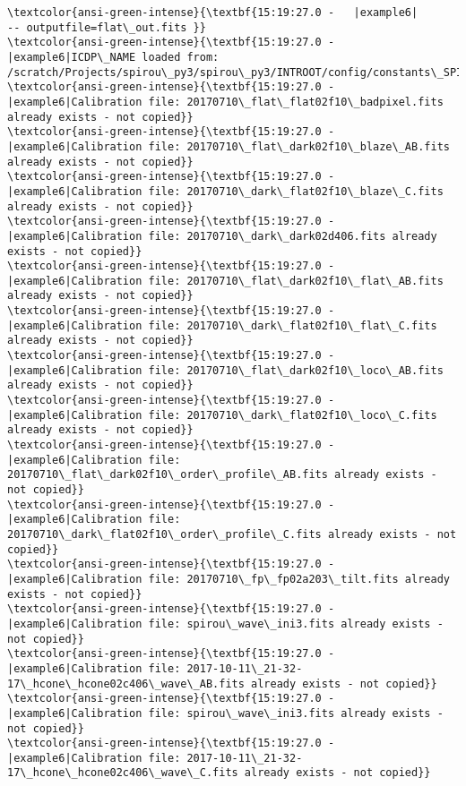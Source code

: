 \documentclass[11pt]{article}
\begin{document}
\begin{Verbatim}[commandchars=\\\{\}]
\textcolor{ansi-green-intense}{\textbf{15:19:27.0 -   |example6|       -- outputfile=flat\_out.fits }}
\textcolor{ansi-green-intense}{\textbf{15:19:27.0 -   |example6|ICDP\_NAME loaded from: /scratch/Projects/spirou\_py3/spirou\_py3/INTROOT/config/constants\_SPIROU.py}}
\textcolor{ansi-green-intense}{\textbf{15:19:27.0 -   |example6|Calibration file: 20170710\_flat\_flat02f10\_badpixel.fits already exists - not copied}}
\textcolor{ansi-green-intense}{\textbf{15:19:27.0 -   |example6|Calibration file: 20170710\_flat\_dark02f10\_blaze\_AB.fits already exists - not copied}}
\textcolor{ansi-green-intense}{\textbf{15:19:27.0 -   |example6|Calibration file: 20170710\_dark\_flat02f10\_blaze\_C.fits already exists - not copied}}
\textcolor{ansi-green-intense}{\textbf{15:19:27.0 -   |example6|Calibration file: 20170710\_dark\_dark02d406.fits already exists - not copied}}
\textcolor{ansi-green-intense}{\textbf{15:19:27.0 -   |example6|Calibration file: 20170710\_flat\_dark02f10\_flat\_AB.fits already exists - not copied}}
\textcolor{ansi-green-intense}{\textbf{15:19:27.0 -   |example6|Calibration file: 20170710\_dark\_flat02f10\_flat\_C.fits already exists - not copied}}
\textcolor{ansi-green-intense}{\textbf{15:19:27.0 -   |example6|Calibration file: 20170710\_flat\_dark02f10\_loco\_AB.fits already exists - not copied}}
\textcolor{ansi-green-intense}{\textbf{15:19:27.0 -   |example6|Calibration file: 20170710\_dark\_flat02f10\_loco\_C.fits already exists - not copied}}
\textcolor{ansi-green-intense}{\textbf{15:19:27.0 -   |example6|Calibration file: 20170710\_flat\_dark02f10\_order\_profile\_AB.fits already exists - not copied}}
\textcolor{ansi-green-intense}{\textbf{15:19:27.0 -   |example6|Calibration file: 20170710\_dark\_flat02f10\_order\_profile\_C.fits already exists - not copied}}
\textcolor{ansi-green-intense}{\textbf{15:19:27.0 -   |example6|Calibration file: 20170710\_fp\_fp02a203\_tilt.fits already exists - not copied}}
\textcolor{ansi-green-intense}{\textbf{15:19:27.0 -   |example6|Calibration file: spirou\_wave\_ini3.fits already exists - not copied}}
\textcolor{ansi-green-intense}{\textbf{15:19:27.0 -   |example6|Calibration file: 2017-10-11\_21-32-17\_hcone\_hcone02c406\_wave\_AB.fits already exists - not copied}}
\textcolor{ansi-green-intense}{\textbf{15:19:27.0 -   |example6|Calibration file: spirou\_wave\_ini3.fits already exists - not copied}}
\textcolor{ansi-green-intense}{\textbf{15:19:27.0 -   |example6|Calibration file: 2017-10-11\_21-32-17\_hcone\_hcone02c406\_wave\_C.fits already exists - not copied}}

    \end{Verbatim}
\end{document}
